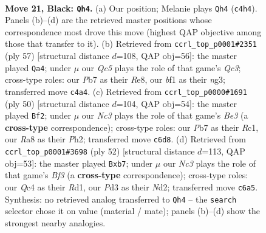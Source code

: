 \documentclass[11pt]{article}
\begin{document}
\clearpage

\begin{figure}[p]\centering
\begin{subfigure}{0.46\textwidth}\centering
\resizebox{\linewidth}{!}{%
\newchessgame
\chessboard[
  setfen={r1b1k3/pp6/2n3p1/4b1P1/2q5/3p1Q2/3B2K1/1R3BN1 b q - 5 21},
  showmover=false,
  pgfstyle=straightmove, color=movearrow, markmove={c4-h4}
]}
\caption{}
\end{subfigure}\hfill
\begin{subfigure}{0.46\textwidth}\centering
\resizebox{\linewidth}{!}{%
\newchessgame
\chessboard[
  setfen={3kr3/3n3Q/2q2p2/2b5/3pp3/6N1/5PPP/2BR2K1 b - - 3 29},
  showmover=false,
  pgfstyle=straightmove, color=movearrow, markmove={c6-a4}
]}
\caption{}
\end{subfigure}
\\[4pt]
\begin{subfigure}{0.46\textwidth}\centering
\resizebox{\linewidth}{!}{%
\newchessgame
\chessboard[
  setfen={r5k1/1b2qppp/3b4/3P4/5P2/3QBBP1/7P/2R3K1 w - - 1 26},
  showmover=false,
  pgfstyle=straightmove, color=movearrow, markmove={e3-f2}
]}
\caption{}
\end{subfigure}\hfill
\begin{subfigure}{0.46\textwidth}\centering
\resizebox{\linewidth}{!}{%
\newchessgame
\chessboard[
  setfen={1q1r2k1/1b3pp1/4p2p/2b5/Q7/4PB1P/3N1PP1/3R2K1 w - - 0 27},
  showmover=false,
  pgfstyle=straightmove, color=movearrow, markmove={f3-b7}
]}
\caption{}
\end{subfigure}
\caption{\textbf{Move 21, Black: \texttt{Qh4}.} (a) Our position; Melanie plays \texttt{Qh4} (\texttt{c4h4}). Panels (b)--(d) are the retrieved master positions whose correspondence most drove this move (highest QAP objective among those that transfer to it). (b) Retrieved from \texttt{ccrl\_top\_p0001\#2351} (ply 57) [structural distance $d$=108, QAP obj=56]: the master played \texttt{Qa4}; under $\mu$ our \emph{Qc5} plays the role of that game's \emph{Qc3}; cross-type roles: our \emph{P}b7 as their \emph{R}e8, our \emph{b}f1 as their \emph{n}g3; transferred move \texttt{c4a4}. (c) Retrieved from \texttt{ccrl\_top\_p0000\#1691} (ply 50) [structural distance $d$=104, QAP obj=54]: the master played \texttt{Bf2}; under $\mu$ our \emph{Nc3} plays the role of that game's \emph{Be3} (a \textbf{cross-type} correspondence); cross-type roles: our \emph{P}b7 as their \emph{R}c1, our \emph{R}a8 as their \emph{P}h2; transferred move \texttt{c6d8}. (d) Retrieved from \texttt{ccrl\_top\_p0001\#3698} (ply 52) [structural distance $d$=113, QAP obj=53]: the master played \texttt{Bxb7}; under $\mu$ our \emph{Nc3} plays the role of that game's \emph{Bf3} (a \textbf{cross-type} correspondence); cross-type roles: our \emph{Q}c4 as their \emph{R}d1, our \emph{P}d3 as their \emph{N}d2; transferred move \texttt{c6a5}. Synthesis: no retrieved analog transferred to \texttt{Qh4} -- the \texttt{search} selector chose it on value (material / mate); panels (b)--(d) show the strongest nearby analogies.}
\label{fig:thought-m41}
\end{figure}
\end{document}
